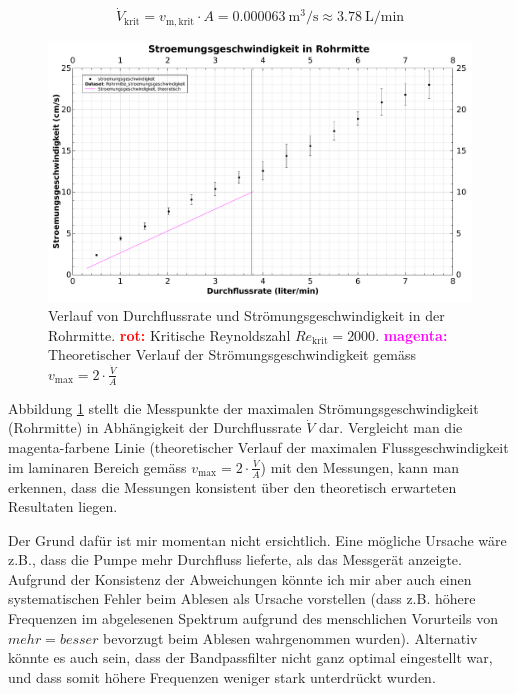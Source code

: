 \begin{equation}
    \label{eq:Q:reynolds_krit}
    \dot{V}_{\mathrm{krit}} = v_{\mathrm{m,krit}} \cdot A = \SI{0.000063}{\cubic\meter\per\second} \approx \SI{3.78}{\liter\per\minute}
\end{equation}

\begin{figure}
    \centering
    \includegraphics[width=\textwidth]{images/rohrmitte.pdf}
    \caption{%
        Verlauf    von     Durchflussrate    und    Str\"omungsgeschwindigkeit
        in     der     Rohrmitte.     \textcolor{red}{\textbf{rot:}} Kritische
        Reynoldszahl        $\mathit{Re}_{\mathrm{krit}}       =        2000$.
        \textcolor{magenta}{\textbf{magenta:}} Theoretischer    Verlauf    der
        Str\"omungsgeschwindigkeit  gem\"ass   $v_{\mathrm{max}}  =   2  \cdot
        \frac{\dot{V}}{A}$
    }
    \label{fig:flowspeed:middle}
\end{figure}

Abbildung  \ref{fig:flowspeed:middle}  stellt  die  Messpunkte  der  maximalen
Str\"omungsgeschwindigkeit  (Rohrmitte) in  Abh\"angigkeit der  Durchflussrate
$\dot{V}$  dar.   Vergleicht  man  die  magenta-farbene  Linie  (theoretischer
Verlauf  der  maximalen  Flussgeschwindigkeit im  laminaren  Bereich  gem\"ass
$v_{\mathrm{max}} =  2 \cdot  \frac{\dot{V}}{A}$) mit den Messungen,  kann man
erkennen,  dass die  Messungen  konsistent \"uber  den theoretisch  erwarteten
Resultaten liegen.

Der Grund daf\"ur ist mir  momentan nicht ersichtlich. Eine m\"ogliche Ursache
w\"are  z.B., dass  die Pumpe  mehr Durchfluss  lieferte, als  das Messger\"at
anzeigte. Aufgrund  der  Konsistenz der  Abweichungen  k\"onnte  ich mir  aber
auch einen  systematischen Fehler  beim Ablesen  als Ursache  vorstellen (dass
z.B.  h\"ohere Frequenzen  im abgelesenen  Spektrum aufgrund  des menschlichen
Vorurteils   von  $mehr   =  besser$   bevorzugt  beim   Ablesen  wahrgenommen
wurden). Alternativ k\"onnte es auch sein,  dass der Bandpassfilter nicht ganz
optimal  eingestellt war,  und dass  somit h\"ohere  Frequenzen weniger  stark
unterdr\"uckt wurden.

